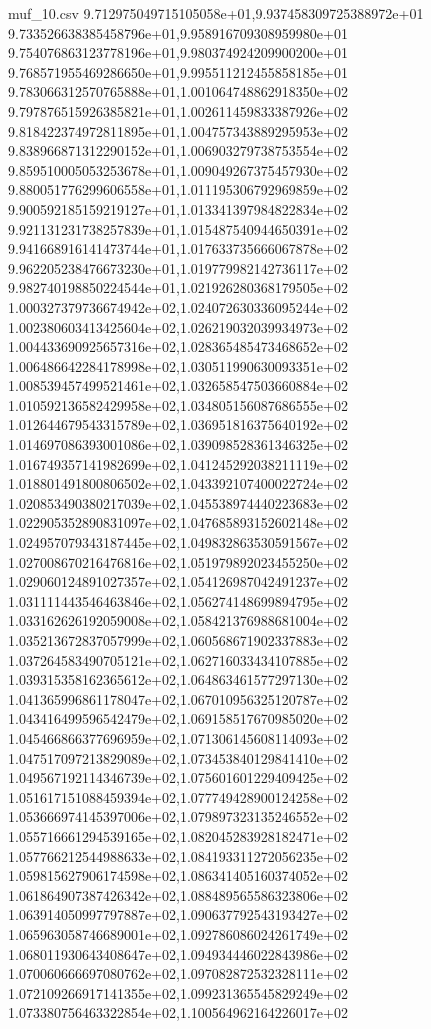 \begin{filecontents*}{muf_10.csv}
9.712975049715105058e+01,9.937458309725388972e+01
9.733526638385458796e+01,9.958916709308959980e+01
9.754076863123778196e+01,9.980374924209900200e+01
9.768571955469286650e+01,9.995511212455858185e+01
9.783066312570765888e+01,1.001064748862918350e+02
9.797876515926385821e+01,1.002611459833387926e+02
9.818422374972811895e+01,1.004757343889295953e+02
9.838966871312290152e+01,1.006903279738753554e+02
9.859510005053253678e+01,1.009049267375457930e+02
9.880051776299606558e+01,1.011195306792969859e+02
9.900592185159219127e+01,1.013341397984822834e+02
9.921131231738257839e+01,1.015487540944650391e+02
9.941668916141473744e+01,1.017633735666067878e+02
9.962205238476673230e+01,1.019779982142736117e+02
9.982740198850224544e+01,1.021926280368179505e+02
1.000327379736674942e+02,1.024072630336095244e+02
1.002380603413425604e+02,1.026219032039934973e+02
1.004433690925657316e+02,1.028365485473468652e+02
1.006486642284178998e+02,1.030511990630093351e+02
1.008539457499521461e+02,1.032658547503660884e+02
1.010592136582429958e+02,1.034805156087686555e+02
1.012644679543315789e+02,1.036951816375640192e+02
1.014697086393001086e+02,1.039098528361346325e+02
1.016749357141982699e+02,1.041245292038211119e+02
1.018801491800806502e+02,1.043392107400022724e+02
1.020853490380217039e+02,1.045538974440223683e+02
1.022905352890831097e+02,1.047685893152602148e+02
1.024957079343187445e+02,1.049832863530591567e+02
1.027008670216476816e+02,1.051979892023455250e+02
1.029060124891027357e+02,1.054126987042491237e+02
1.031111443546463846e+02,1.056274148699894795e+02
1.033162626192059008e+02,1.058421376988681004e+02
1.035213672837057999e+02,1.060568671902337883e+02
1.037264583490705121e+02,1.062716033434107885e+02
1.039315358162365612e+02,1.064863461577297130e+02
1.041365996861178047e+02,1.067010956325120787e+02
1.043416499596542479e+02,1.069158517670985020e+02
1.045466866377696959e+02,1.071306145608114093e+02
1.047517097213829089e+02,1.073453840129841410e+02
1.049567192114346739e+02,1.075601601229409425e+02
1.051617151088459394e+02,1.077749428900124258e+02
1.053666974145397006e+02,1.079897323135246552e+02
1.055716661294539165e+02,1.082045283928182471e+02
1.057766212544988633e+02,1.084193311272056235e+02
1.059815627906174598e+02,1.086341405160374052e+02
1.061864907387426342e+02,1.088489565586323806e+02
1.063914050997797887e+02,1.090637792543193427e+02
1.065963058746689001e+02,1.092786086024261749e+02
1.068011930643408647e+02,1.094934446022843986e+02
1.070060666697080762e+02,1.097082872532328111e+02
1.072109266917141355e+02,1.099231365545829249e+02
1.073380756463322854e+02,1.100564962164226017e+02

\end{filecontents*}
